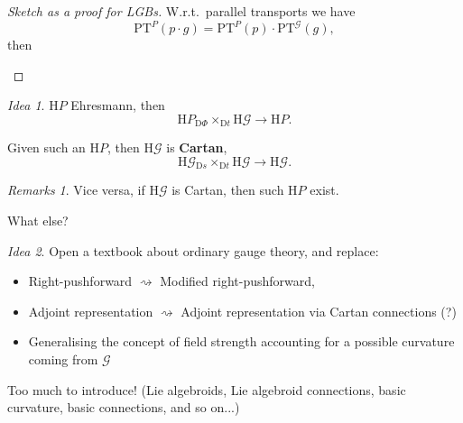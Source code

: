 \documentclass[
aspectratio=3218, 
10pt
]{beamer}
\newcommand\fibtimes[2]{\mathbin{_{#1}\times_{#2}}}
\def\bes{\begin{equation*}}
\def\ees{\end{equation*}}
\theoremstyle{plain}
\theoremstyle{remark}
\newtheorem*{remark}{Remarks}
\newtheorem*{idea}{Idea}
\begin{document}
{\begin{frame}
\begin{proof}[Sketch as a proof for LGBs]\vspace{.5pt}
W.r.t.\ parallel transports we have
\bes
\mathup{PT}^P(p\cdot g) = \mathup{PT}^P(p) \cdot \mathup{PT}^{\mathcal{G}}(g),
\ees
then
\begin{center}
\end{center}
\end{proof}
\end{frame}

\begin{frame}
\begin{idea}
$\mathup{H}P$ Ehresmann, then
\bes
\mathup{H}P \fibtimes{\mathup{D}\Phi}{\mathup{D}t} \mathup{H}\mathcal{G}
\to 
\mathup{H}P.
\ees
\end{idea}

\begin{theorem}\vspace{.5pt}
Given such an $\mathup{H}P$, then $\mathup{H}\mathcal{G}$ is \textbf{Cartan},
\bes
\mathup{H}\mathcal{G} \fibtimes{\mathup{D}s}{\mathup{D}t} \mathup{H}\mathcal{G}
\to 
\mathup{H}\mathcal{G}.
\ees
\end{theorem}

\begin{remark}
Vice versa, if $\mathup{H}\mathcal{G}$ is Cartan, then such $\mathup{H}P$ exist.
\end{remark}
\end{frame}


\begin{frame}{What else?}
\begin{idea}
Open a textbook about ordinary gauge theory, and replace:
\begin{itemize}
	\item Right-pushforward $\rightsquigarrow$ Modified right-pushforward,
	\item Adjoint representation $\rightsquigarrow$ Adjoint representation via Cartan connections (?)
	\item Generalising the concept of field strength accounting for a possible curvature coming from $\mathcal{G}$
\end{itemize}
Too much to introduce! (Lie algebroids, Lie algebroid connections, basic curvature, basic connections, and so on...)


\end{idea}
\end{frame}}
\end{document}
